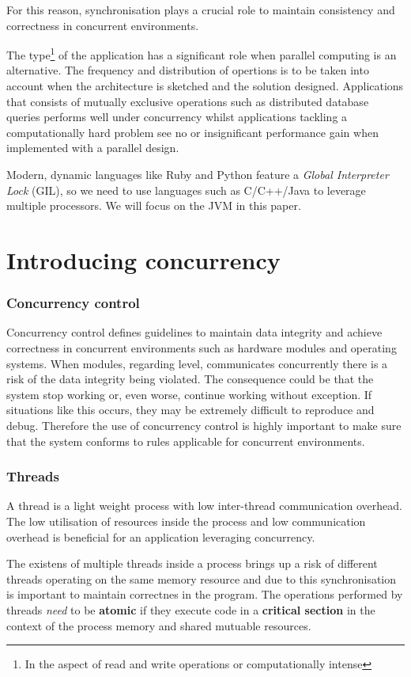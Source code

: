 \documentclass[a4paper,12pt]{kth-mag}
\begin{document}
For this reason, synchronisation plays a crucial role to maintain consistency and correctness in concurrent environments.

The type\footnote{In the aspect of read and write operations or computationally intense} of the application has a significant role when parallel computing is an alternative. The frequency and distribution of opertions is to be taken into account when the architecture is sketched and the solution designed. Applications that consists of mutually exclusive operations such as distributed database queries performs well under concurrency whilst applications tackling a computationally hard problem see no or insignificant performance gain when implemented with a parallel design.

Modern, dynamic languages like Ruby and Python feature a \textit{Global Interpreter Lock} (GIL), so we need to use languages such as C/C++/Java to leverage multiple processors. We will focus on the JVM in this paper.  

\part{Introducing concurrency}

\section{Concurrency control} \label{sec:con_con}
Concurrency control defines guidelines to maintain data integrity and achieve correctness in concurrent environments such as hardware modules and operating systems\cite{concon}. When modules, regarding level, communicates concurrently there is a risk of the data integrity being violated. The consequence could be that the system stop working or, even worse, continue working without exception. If situations like this occurs, they may be extremely difficult to reproduce and debug. Therefore the use of concurrency control is highly important to make sure that the system conforms to rules applicable for concurrent environments.

\section{Threads}
A thread is a light weight process with low inter-thread communication overhead. The low utilisation of resources inside the process and low communication overhead is beneficial for an application leveraging concurrency. 

The existens of multiple threads inside a process brings up a risk of different threads operating on the same memory resource and due to this synchronisation is important to maintain correctnes in the program. The operations performed by threads \textit{need} to be \textbf{atomic} if they execute code in a \textbf{critical section} in the context of the process memory and shared mutuable resources.
\end{document}
